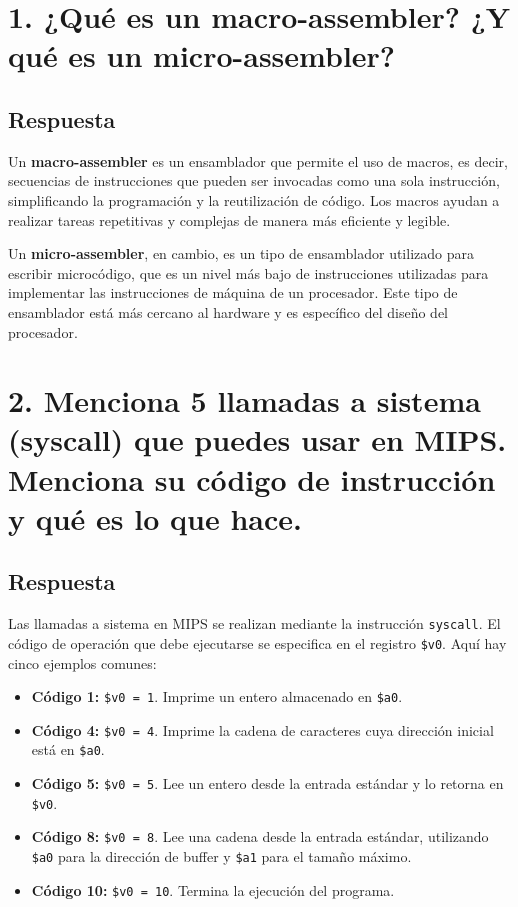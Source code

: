\documentclass{article}
\begin{document}


\section*{1. ¿Qué es un macro-assembler? ¿Y qué es un micro-assembler?}
\subsection*{Respuesta}
Un \textbf{macro-assembler} es un ensamblador que permite el uso de macros, es decir, secuencias de instrucciones que pueden ser invocadas como una sola instrucción, simplificando la programación y la reutilización de código. Los macros ayudan a realizar tareas repetitivas y complejas de manera más eficiente y legible.

Un \textbf{micro-assembler}, en cambio, es un tipo de ensamblador utilizado para escribir microcódigo, que es un nivel más bajo de instrucciones utilizadas para implementar las instrucciones de máquina de un procesador. Este tipo de ensamblador está más cercano al hardware y es específico del diseño del procesador.

\section*{2. Menciona 5 llamadas a sistema (syscall) que puedes usar en MIPS. Menciona su código de instrucción y qué es lo que hace.}
\subsection*{Respuesta}
Las llamadas a sistema en MIPS se realizan mediante la instrucción \texttt{syscall}. El código de operación que debe ejecutarse se especifica en el registro \texttt{\$v0}. Aquí hay cinco ejemplos comunes:
\begin{itemize}
    \item \textbf{Código 1:} \texttt{\$v0 = 1}. Imprime un entero almacenado en \texttt{\$a0}.
    \item \textbf{Código 4:} \texttt{\$v0 = 4}. Imprime la cadena de caracteres cuya dirección inicial está en \texttt{\$a0}.
    \item \textbf{Código 5:} \texttt{\$v0 = 5}. Lee un entero desde la entrada estándar y lo retorna en \texttt{\$v0}.
    \item \textbf{Código 8:} \texttt{\$v0 = 8}. Lee una cadena desde la entrada estándar, utilizando \texttt{\$a0} para la dirección de buffer y \texttt{\$a1} para el tamaño máximo.
    \item \textbf{Código 10:} \texttt{\$v0 = 10}. Termina la ejecución del programa.
\end{itemize}
\end{document}
